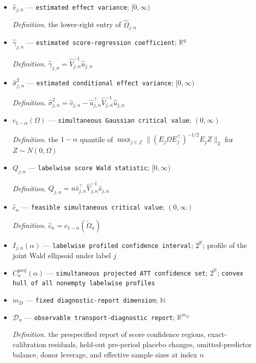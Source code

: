 \documentclass{article}
\begin{document}
\begin{itemize}
  \item \(\widehat v_{j,n}\) --- \texttt{estimated effect variance}; \([0,\infty)\)
  \par\smallskip\noindent\emph{Definition.} the lower-right entry of \(\widehat\Omega_{j,n}\)
  \item \(\widehat\gamma_{j,n}\) --- \texttt{estimated score-\allowbreak{}regression coefficient}; \(\mathbb R^q\)
  \par\smallskip\noindent\emph{Definition.} \(\widehat\gamma_{j,n}=\widehat V_{j,n}^{-1}\widehat u_{j,n}\)
  \item \(\widehat\sigma_{j,n}^2\) --- \texttt{estimated conditional effect variance}; \([0,\infty)\)
  \par\smallskip\noindent\emph{Definition.} \(\widehat\sigma_{j,n}^2=\widehat v_{j,n}-\widehat u_{j,n}^{\top}\widehat V_{j,n}^{-1}\widehat u_{j,n}\)
  \item \(c_{1-\alpha}(\Omega)\) --- \texttt{simultaneous Gaussian critical value}; \((0,\infty)\)
  \par\smallskip\noindent\emph{Definition.} the \(1-\alpha\) quantile of \(\max_{j\in\mathcal J}\|(E_j\Omega E_j^{\top})^{-1/2}E_jZ\|_2\) for \(Z\sim N(0,\Omega)\)
  \item \(Q_{j,n}\) --- \texttt{labelwise score Wald statistic}; \([0,\infty)\)
  \par\smallskip\noindent\emph{Definition.} \(Q_{j,n}=n\widehat s_{j,n}^{\top}\widehat V_{j,n}^{-1}\widehat s_{j,n}\)
  \item \(\widehat c_n\) --- \texttt{feasible simultaneous critical value}; \((0,\infty)\)
  \par\smallskip\noindent\emph{Definition.} \(\widehat c_n=c_{1-\alpha}(\widetilde\Omega_n)\)
  \item \(I_{j,n}(\alpha)\) --- \texttt{labelwise profiled confidence interval}; \(2^{\mathbb R}\); profile of the joint Wald ellipsoid under label \(j\)
  \item \(C_n^{\mathrm{proj}}(\alpha)\) --- \texttt{simultaneous projected ATT confidence set}; \(2^{\mathbb R}\); \texttt{convex hull of all nonempty labelwise profiles}
  \item \(m_D\) --- \texttt{fixed diagnostic-\allowbreak{}report dimension}; \(\mathbb N\)
  \item \(\mathcal D_n\) --- \texttt{observable transport-\allowbreak{}diagnostic report}; \(\mathbb R^{m_D}\)
  \par\smallskip\noindent\emph{Definition.} the prespecified report of score confidence regions, exact-calibration residuals, held-out pre-period placebo changes, omitted-predictor balance, donor leverage, and effective sample sizes at index \(n\)

\end{itemize}
\end{document}
